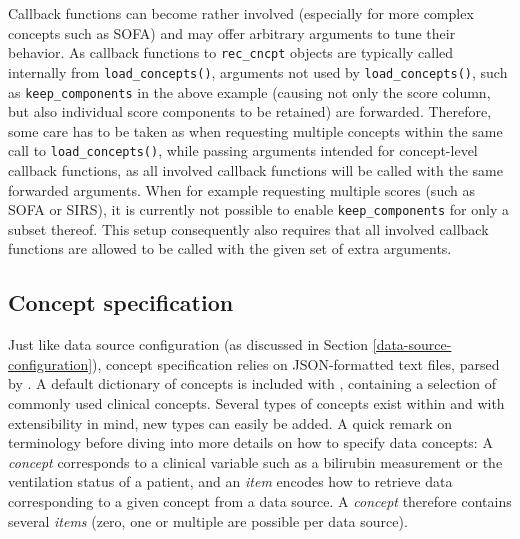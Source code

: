 \documentclass[
  notitle,
  nojss,
  noheadings]{jss}
\begin{document}
Callback functions can become rather involved (especially for more
complex concepts such as SOFA) and may offer arbitrary arguments to tune
their behavior. As callback functions to \texttt{rec\_cncpt} objects are
typically called internally from \texttt{load\_concepts()}, arguments
not used by \texttt{load\_concepts()}, such as \texttt{keep\_components}
in the above example (causing not only the score column, but also
individual score components to be retained) are forwarded. Therefore,
some care has to be taken as when requesting multiple concepts within
the same call to \texttt{load\_concepts()}, while passing arguments
intended for concept-level callback functions, as all involved callback
functions will be called with the same forwarded arguments. When for
example requesting multiple scores (such as SOFA or SIRS), it is
currently not possible to enable \texttt{keep\_components} for only a
subset thereof. This setup consequently also requires that all involved
callback functions are allowed to be called with the given set of extra
arguments.

\hypertarget{concept-specification}{%
\subsection{Concept specification}\label{concept-specification}}

Just like data source configuration (as discussed in Section
\ref{data-source-configuration}), concept specification relies on
JSON-formatted text files, parsed by  \citep{ooms2014}. A
default dictionary of concepts is included with , containing a
selection of commonly used clinical concepts. Several types of concepts
exist within  and with extensibility in mind, new types can
easily be added. A quick remark on terminology before diving into more
details on how to specify data concepts: A \emph{concept} corresponds to
a clinical variable such as a bilirubin measurement or the ventilation
status of a patient, and an \emph{item} encodes how to retrieve data
corresponding to a given concept from a data source. A \emph{concept}
therefore contains several \emph{items} (zero, one or multiple are
possible per data source).
\end{document}
